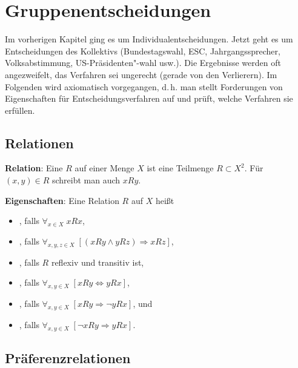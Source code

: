 \section{%
    Gruppenentscheidungen%
}

Im vorherigen Kapitel ging es um Individualentscheidungen.
Jetzt geht es um Entscheidungen des Kollektivs
(Bundestagswahl, ESC, Jahrgangssprecher, Volksabstimmung, US-Präsidenten"-wahl usw.).
Die Ergebnisse werden oft angezweifelt, das Verfahren sei ungerecht
(gerade von den Verlierern).
Im Folgenden wird axiomatisch vorgegangen, d.\,h. man stellt Forderungen von Eigenschaften für
Entscheidungsverfahren auf und prüft, welche Verfahren sie erfüllen.

\subsection{%
    Relationen%
}

\textbf{Relation}:
Eine  $R$ auf einer Menge $X$ ist eine Teilmenge $R \subset X^2$.
Für $(x, y) \in R$ schreibt man auch $xRy$.

\textbf{Eigenschaften}:
Eine Relation $R$ auf $X$ heißt
\begin{itemize}
    \item
    , falls $\forall_{x \in X}\; xRx$,
    
    \item
    , falls $\forall_{x, y, z \in X}\; [(xRy \land yRz) \Rightarrow xRz]$,
    
    \item
    , falls $R$ reflexiv und transitiv ist,
    
    \item
    , falls
    $\forall_{x, y \in X}\; [xRy \Leftrightarrow yRx]$,
    
    \item
    , falls
    $\forall_{x, y \in X}\; [xRy \Rightarrow \lnot yRx]$, und
    
    \item
    , falls
    $\forall_{x, y \in X}\; [\lnot xRy \Rightarrow yRx]$.
\end{itemize}

\subsection{%
    Präferenzrelationen%
}

